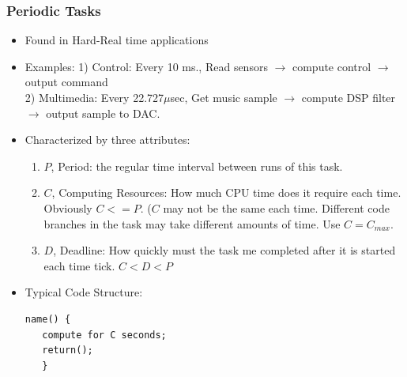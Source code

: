 \subsubsection{Periodic Tasks}\label{Periodic}
\begin{itemize}
        \item Found in  Hard-Real time applications
        \item Examples: 1) Control: Every 10 ms., Read sensors $\to$ compute control $\to$ output
command\\
          2) Multimedia: Every 22.727$\mu$sec,  Get music sample $\to$ compute DSP filter $\to$ output
sample to DAC.

        \item Characterized by three attributes:
                \begin{enumerate}
                        \item $P$, Period: the regular time interval between runs of this task.
                        \item $C$, Computing Resources: How much CPU time  does it require
each time. Obviously $C <= P$. ($C$ may not be the same each time.
Different code branches in the task may take different amounts of time. Use $C=C_{max}$.
                        \item $D$, Deadline: How quickly must the task me completed after it
is started each time tick. $C < D < P$
                \end{enumerate}
         \item Typical Code Structure:
\begin{verbatim}
name() {
   compute for C seconds;
   return();
   }
\end{verbatim}
\end{itemize}




